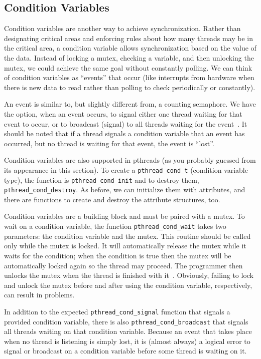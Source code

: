 \subsection*{Condition Variables}
Condition variables are another way to achieve synchronization. Rather than designating critical areas and enforcing rules about how many threads may be in the critical area, a condition variable allows synchronization based on the value of the data. Instead of locking a mutex, checking a variable, and then unlocking the mutex, we could achieve the same goal without constantly polling. We can think of condition variables as ``events'' that occur (like interrupts from hardware when there is new data to read rather than polling to check periodically or constantly).

An event is similar to, but slightly different from, a counting semaphore. We have the option, when an event occurs, to signal either one thread waiting for that event to occur, or to broadcast (signal) to all threads waiting for the event~\cite{mte241}. It should be noted that if a thread signals a condition variable that an event has occurred, but no thread is waiting for that event, the event is ``lost''. 

Condition variables are also supported in pthreads (as you probably guessed from its appearance in this section). To create a \texttt{pthread\_cond\_t} (condition variable type), the function is \texttt{pthread\_cond\_init} and to destroy them, \texttt{pthread\_cond\_destroy}. As before, we can initialize them with attributes, and there are functions to create and destroy the attribute structures, too. 

Condition variables are a building block and must be paired with a mutex. To wait on a condition variable, the function \texttt{pthread\_cond\_wait} takes two parameters: the condition variable and the mutex. This routine should be called only while the mutex is locked. It will automatically release the mutex while it waits for the condition; when the condition is true then the mutex will be automatically locked again so the thread may proceed. The programmer then unlocks the mutex when the thread is finished with it~\cite{pthreads}. Obviously, failing to lock and unlock the mutex before and after using the condition variable, respectively, can result in problems.

In addition to the expected \texttt{pthread\_cond\_signal} function that signals a provided condition variable, there is also \texttt{pthread\_cond\_broadcast} that signals all threads waiting on that condition variable. Because an event that takes place when no thread is listening is simply lost, it is (almost always) a logical error to signal or broadcast on a condition variable before some thread is waiting on it.


